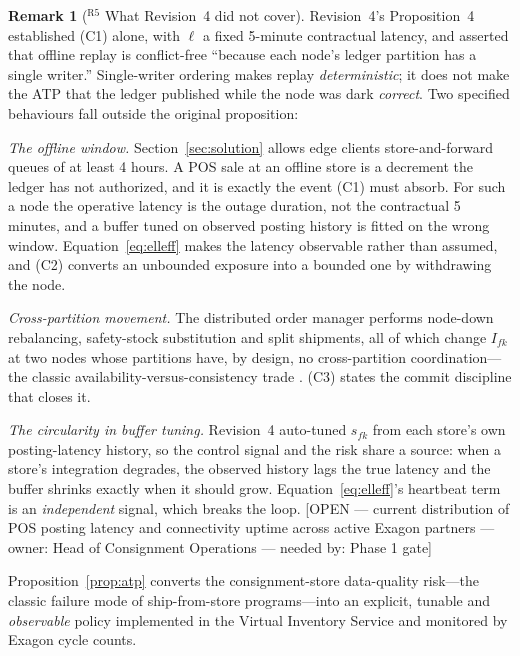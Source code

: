 \documentclass[10pt,twocolumn,letterpaper]{article}
\theoremstyle{definition}
\newtheorem{remark}{Remark}
\newcommand{\OPEN}[3]{{\color{openred}\footnotesize\textsf{[OPEN --- #1 --- owner: #2 --- needed by: #3]}}}
\begin{document}
\begin{remark}[$^{\mathrm{R5}}$ What Revision~4 did not cover]
Revision~4's Proposition~4 established (C1) alone, with $\ell$ a fixed 5-minute contractual latency, and asserted that offline replay is conflict-free ``because each node's ledger partition has a single writer.'' Single-writer ordering makes replay \emph{deterministic}; it does not make the ATP that the ledger published while the node was dark \emph{correct}. Two specified behaviours fall outside the original proposition:

\emph{The offline window.} Section~\ref{sec:solution} allows edge clients store-and-forward queues of at least 4 hours. A POS sale at an offline store is a decrement the ledger has not authorized, and it is exactly the event (C1) must absorb. For such a node the operative latency is the outage duration, not the contractual 5 minutes, and a buffer tuned on observed posting history is fitted on the wrong window. Equation~\eqref{eq:elleff} makes the latency observable rather than assumed, and (C2) converts an unbounded exposure into a bounded one by withdrawing the node.

\emph{Cross-partition movement.} The distributed order manager performs node-down rebalancing, safety-stock substitution and split shipments, all of which change $I_{fk}$ at two nodes whose partitions have, by design, no cross-partition coordination---the classic availability-versus-consistency trade \cite{gilbert2002}. (C3) states the commit discipline that closes it.

\emph{The circularity in buffer tuning.} Revision~4 auto-tuned $s_{fk}$ from each store's own posting-latency history, so the control signal and the risk share a source: when a store's integration degrades, the observed history lags the true latency and the buffer shrinks exactly when it should grow. Equation~\eqref{eq:elleff}'s heartbeat term is an \emph{independent} signal, which breaks the loop. \OPEN{current distribution of POS posting latency and connectivity uptime across active Exagon partners}{Head of Consignment Operations}{Phase 1 gate}
\end{remark}

Proposition~\ref{prop:atp} converts the consignment-store data-quality risk---the classic failure mode of ship-from-store programs---into an explicit, tunable and \emph{observable} policy implemented in the Virtual Inventory Service and monitored by Exagon cycle counts.
\end{document}
